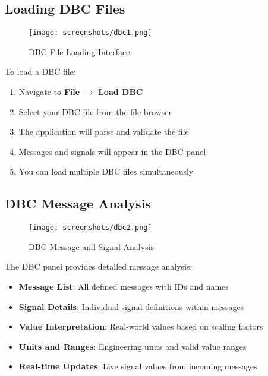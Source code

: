 \documentclass[11pt,a4paper]{article}
\begin{document}
\subsection{Loading DBC Files}

\begin{figure}[H]
    \centering
    \texttt{[image: screenshots/dbc1.png]}
    \caption{DBC File Loading Interface}
    \label{fig:dbc1}
\end{figure}

To load a DBC file:

\begin{enumerate}
    \item Navigate to \textbf{File} $\rightarrow$ \textbf{Load DBC}
    \item Select your DBC file from the file browser
    \item The application will parse and validate the file
    \item Messages and signals will appear in the DBC panel
    \item You can load multiple DBC files simultaneously
\end{enumerate}

\subsection{DBC Message Analysis}

\begin{figure}[H]
    \centering
    \texttt{[image: screenshots/dbc2.png]}
    \caption{DBC Message and Signal Analysis}
    \label{fig:dbc2}
\end{figure}

The DBC panel provides detailed message analysis:

\begin{itemize}
    \item \textbf{Message List}: All defined messages with IDs and names
    \item \textbf{Signal Details}: Individual signal definitions within messages
    \item \textbf{Value Interpretation}: Real-world values based on scaling factors
    \item \textbf{Units and Ranges}: Engineering units and valid value ranges
    \item \textbf{Real-time Updates}: Live signal values from incoming messages
\end{itemize}
\end{document}
